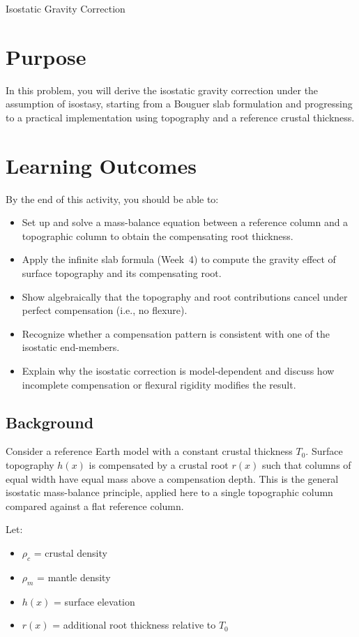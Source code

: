\begin{activity}{Isostatic Gravity Correction}

\section*{Purpose}

In this problem, you will derive the isostatic gravity correction under the assumption of isostasy, starting from a Bouguer slab formulation and progressing to a practical implementation using topography and a reference crustal thickness.

\section*{Learning Outcomes}

By the end of this activity, you should be able to:
\begin{itemize}
  \item Set up and solve a mass-balance equation between a reference column and a topographic column to obtain the compensating root thickness.
  \item Apply the infinite slab formula (Week~4) to compute the gravity effect of surface topography and its compensating root.
  \item Show algebraically that the topography and root contributions cancel under perfect compensation (i.e., no flexure).
  \item Recognize whether a compensation pattern is consistent with one of the isostatic end-members.
  \item Explain why the isostatic correction is model-dependent and discuss how incomplete compensation or flexural rigidity modifies the result.
\end{itemize}

\subsection*{Background}

Consider a reference Earth model with a constant crustal thickness $T_0$. Surface topography $h(x)$ is compensated by a crustal root $r(x)$ such that columns of equal width have equal mass above a compensation depth. This is the general isostatic mass-balance principle, applied here to a single topographic column compared against a flat reference column.

Let:
\begin{itemize}
    \item $\rho_c$ = crustal density
    \item $\rho_m$ = mantle density
    \item $h(x)$ = surface elevation
    \item $r(x)$ = additional root thickness relative to $T_0$
\end{itemize}


\end{activity}
